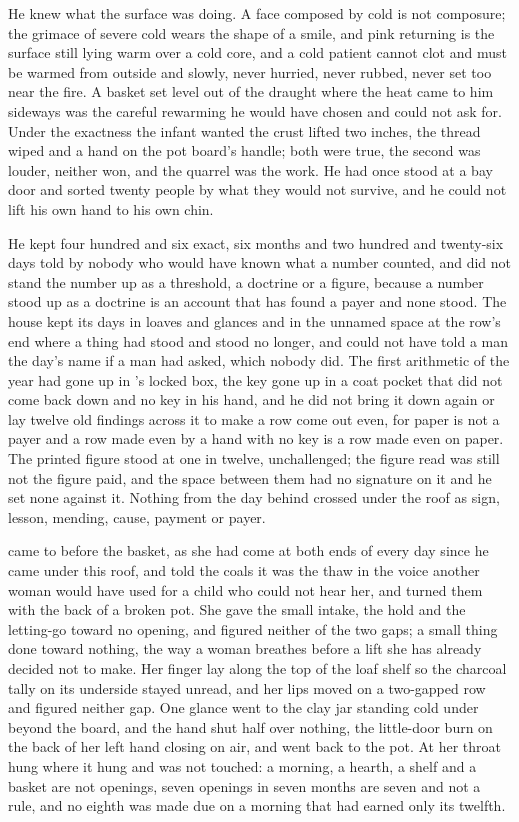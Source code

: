 He knew what the surface was doing. A face composed by cold is not composure; the grimace of severe cold wears the shape of a smile, and pink returning is the surface still lying warm over a cold core, and a cold patient cannot clot and must be warmed from outside and slowly, never hurried, never rubbed, never set too near the fire. A basket set level out of the draught where the heat came to him sideways was the careful rewarming he would have chosen and could not ask for. Under the exactness the infant wanted the crust lifted two inches, the thread wiped and a hand on the pot board's handle; both were true, the second was louder, neither won, and the quarrel was the work. He had once stood at a bay door and sorted twenty people by what they would not survive, and he could not lift his own hand to his own chin.

He kept four hundred and six exact, six months and two hundred and twenty-six days told by nobody who would have known what a number counted, and did not stand the number up as a threshold, a doctrine or a figure, because a number stood up as a doctrine is an account that has found a payer and none stood. The house kept its days in loaves and glances and in the unnamed space at the row's end where a thing had stood and stood no longer, and could not have told a man the day's name if a man had asked, which nobody did. The first arithmetic of the year had gone up  in 's locked box, the key gone up in a coat pocket that did not come back down and no key in his hand, and he did not bring it down again or lay twelve old findings across it to make a row come out even, for paper is not a payer and a row made even by a hand with no key is a row made even on paper. The printed figure stood at one in twelve, unchallenged; the figure read was still not the figure paid, and the space between them had no signature on it and he set none against it. Nothing from the day behind crossed under the roof as sign, lesson, mending, cause, payment or payer.

 came to  before the basket, as she had come at both ends of every day since he came under this roof, and told the coals it was the thaw in the voice another woman would have used for a child who could not hear her, and turned them with the back of a broken pot. She gave the small intake, the hold and the letting-go toward no opening, and figured neither of the two gaps; a small thing done toward nothing, the way a woman breathes before a lift she has already decided not to make. Her finger lay along the top of the loaf shelf so the charcoal tally on its underside stayed unread, and her lips moved on a two-gapped row and figured neither gap. One glance went to the clay jar standing cold under  beyond the board, and the hand shut half over nothing, the little-door burn on the back of her left hand closing on air, and went back to the pot. At her throat  hung where it hung and was not touched: a morning, a hearth, a shelf and a basket are not openings, seven openings in seven months are seven and not a rule, and no eighth was made due on a morning that had earned only its twelfth.

